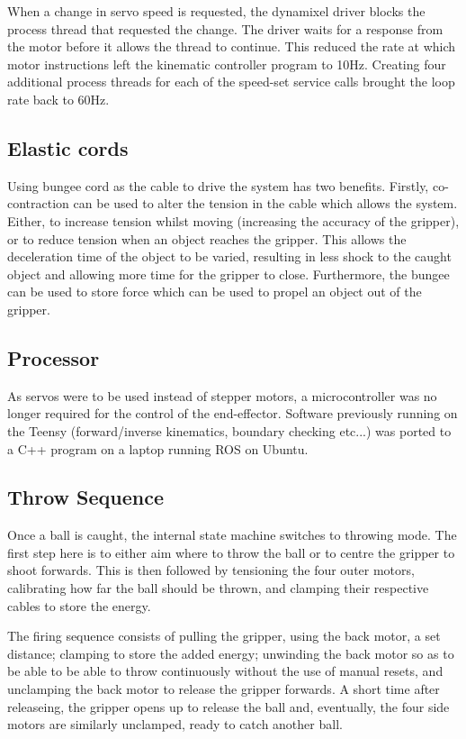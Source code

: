 \documentclass[conference]{IEEEtran}
\begin{document}
When a change in servo speed is requested, the dynamixel driver blocks the process thread that requested the change. The driver waits for a response from the motor before it allows the thread to continue. This reduced the rate at which motor instructions left the kinematic controller program to 10Hz. Creating four additional process threads for each of the speed-set service calls brought the loop rate back to 60Hz.

\subsection{Elastic cords}
Using bungee cord as the cable to drive the system has two benefits. Firstly, co-contraction can be used to alter the tension in the cable which allows the system. Either, to increase tension whilst moving (increasing the accuracy of the gripper), or to reduce tension when an object reaches the gripper. This allows the deceleration time of the object to be varied, resulting in less shock to the caught object and allowing more time for the gripper to close. Furthermore, the bungee can be used to store force which can be used to propel an object out of the gripper.

\subsection{Processor}
As servos were to be used instead of stepper motors, a microcontroller was no longer required for the control of the end-effector. Software previously running on the Teensy (forward/inverse kinematics, boundary checking etc...) was ported to a C++ program on a laptop running ROS on Ubuntu. 

\subsection{Throw Sequence}
Once a ball is caught, the internal state machine switches to throwing mode. The first step here is to either aim where to throw the ball or to centre the gripper to shoot forwards. This is then followed by tensioning the four outer motors, calibrating how far the ball should be thrown, and clamping their respective cables to store the energy.

The firing sequence consists of pulling the gripper, using the back motor, a set distance; clamping to store the added energy; unwinding the back motor so as to be able to be able to throw continuously without the use of manual resets, and unclamping the back motor to release the gripper forwards. A short time after releaseing, the gripper opens up to release the ball and, eventually, the four side motors are similarly unclamped, ready to catch another ball.
\end{document}

